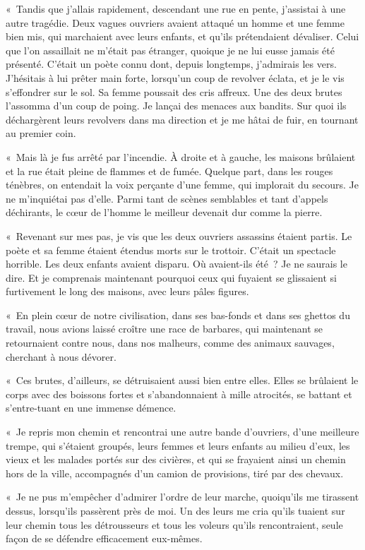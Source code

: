 \documentclass[french,twoside]{book} %
\begin{document}
« Tandis que j’allais rapidement, descendant une rue en pente, j’assistai à une autre tragédie. Deux vagues ouvriers avaient attaqué un homme et une femme bien mis, qui marchaient avec leurs enfants, et qu’ils prétendaient dévaliser. Celui que l’on assaillait ne m’était pas étranger, quoique je ne lui eusse jamais été présenté. C’était un poète connu dont, depuis longtemps, j’admirais les vers. J’hésitais à lui prêter main forte, lorsqu’un coup de revolver éclata, et je le vis s’effondrer sur le sol. Sa femme poussait des cris affreux. Une des deux brutes l’assomma d’un coup de poing. Je lançai des menaces aux bandits. Sur quoi ils déchargèrent leurs revolvers dans ma direction et je me hâtai de fuir, en tournant au premier coin.\par
« Mais là je fus arrêté par l’incendie. À droite et à gauche, les maisons brûlaient et la rue était pleine de flammes et de fumée. Quelque part, dans les rouges ténèbres, on entendait la voix perçante d’une femme, qui implorait du secours. Je ne m’inquiétai pas d’elle. Parmi tant de scènes semblables et tant d’appels déchirants, le cœur de l’homme le meilleur devenait dur comme la pierre.\par
« Revenant sur mes pas, je vis que les deux ouvriers assassins étaient partis. Le poète et sa femme étaient étendus morts sur le trottoir. C’était un spectacle horrible. Les deux enfants avaient disparu. Où avaient-ils été ? Je ne saurais le dire. Et je comprenais maintenant pourquoi ceux qui fuyaient se glissaient si furtivement le long des maisons, avec leurs pâles figures.\par
« En plein cœur de notre civilisation, dans ses bas-fonds et dans ses ghettos du travail, nous avions laissé croître une race de barbares, qui maintenant se retournaient contre nous, dans nos malheurs, comme des animaux sauvages, cherchant à nous dévorer.\par
« Ces brutes, d’ailleurs, se détruisaient aussi bien entre elles. Elles se brûlaient le corps avec des boissons fortes et s’abandonnaient à mille atrocités, se battant et s’entre-tuant en une immense démence.\par
« Je repris mon chemin et rencontrai une autre bande d’ouvriers, d’une meilleure trempe, qui s’étaient groupés, leurs femmes et leurs enfants au milieu d’eux, les vieux et les malades portés sur des civières, et qui se frayaient ainsi un chemin hors de la ville, accompagnés d’un camion de provisions, tiré par des chevaux.\par
« Je ne pus m’empêcher d’admirer l’ordre de leur marche, quoiqu’ils me tirassent dessus, lorsqu’ils passèrent près de moi. Un des leurs me cria qu’ils tuaient sur leur chemin tous les détrousseurs et tous les voleurs qu’ils rencontraient, seule façon de se défendre efficacement eux-mêmes.\par
\end{document}
